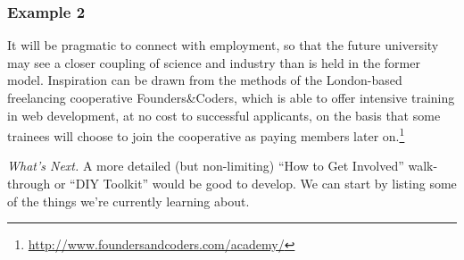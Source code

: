 \subsubsection*{Example 2} It will be pragmatic to connect
 with employment, so that the future
university may see a closer coupling of science and industry than is
held in the former model.  Inspiration can be drawn from the methods
of the London-based freelancing cooperative Founders\&Coders, which is
able to offer intensive training in web development, at no cost to
successful applicants, on the basis that some trainees will choose to
join the cooperative as paying members later
on.\footnote{\url{http://www.foundersandcoders.com/academy/}}


\begin{framed}
\noindent 
\emph{What's Next.}
A more detailed (but non-limiting) ``How to Get Involved'' walk-through or ``DIY Toolkit'' would be good to develop. We can start by listing some of the things we're currently learning about.
\end{framed}
